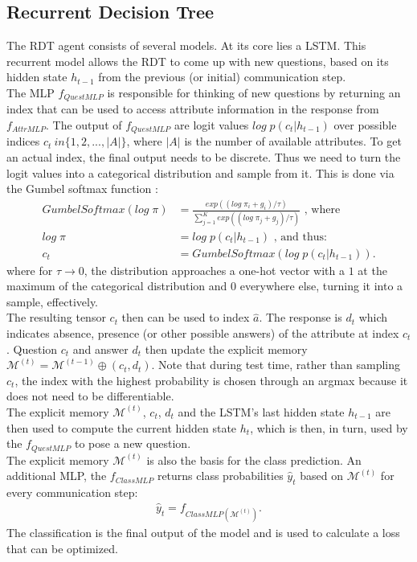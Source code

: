 \documentclass[a4paper,cleardoubleempty,BCOR1cm, 11pt]{report}
\begin{document}
\subsection{Recurrent Decision Tree}
The RDT agent consists of several models. At its core lies a LSTM. This recurrent model allows the RDT to come up with new questions, based on its hidden state $h_{t-1}$ from the previous (or initial) communication step.\\
The MLP $f_{QuestMLP}$ is responsible for thinking of new questions by returning an index that can be used to access attribute information in the response from $f_{AttrMLP}$. The output of $f_{QuestMLP}$ are logit values $log\;p(c_t|h_{t-1})$ over possible indices $c_t \ in \lbrace 1,2,...,|A| \rbrace$, where $|A|$ is the number of available attributes. To get an actual index, the final output needs to be discrete. Thus we need to turn the logit values into a categorical distribution and sample from it. This is done via the Gumbel softmax function \cite{jang2016categorical}:
\begin{align}
		GumbelSoftmax(log\;\pi) &= \frac{exp((log\;\pi_i + g_i)/\tau)}{\sum_{j=1}^{K}exp((log\;\pi_j + g_j)/\tau)}\text{ , where}\\
			log\;\pi &=log\;p(c_t|h_{t-1})\text{ , and thus:}\\
			c_t &= GumbelSoftmax(log\;p(c_t|h_{t-1})).
\end{align}
where for $\tau \rightarrow 0$, the distribution approaches a one-hot vector with a $1$ at the maximum of the categorical distribution and $0$ everywhere else, turning it into a sample, effectively.\\
The resulting tensor $c_t$ then can be used to index $\hat{a}$. The response is $d_t$ which indicates absence, presence (or other possible answers) of the attribute at index $c_t$. Question $c_t$ and answer $d_t$ then update the explicit memory $\mathcal{M}^{(t)} = \mathcal{M}^{(t-1)} \oplus (c_t, d_t)$. Note that during test time, rather than sampling $c_t$, the index with the highest probability is chosen through an argmax because it does not need to be differentiable.\\
The explicit memory $\mathcal{M}^{(t)}$, $c_t$, $d_t$ and the LSTM's last hidden state $h_{t-1}$ are then used to compute the current hidden state $h_t$, which is then, in turn, used by the $f_{QuestMLP}$ to pose a new question.\\
The explicit memory $\mathcal{M}^{(t)}$ is also the basis for the class prediction. An additional MLP, the $f_{ClassMLP}$ returns class probabilities $\hat{y}_t$ based on  $\mathcal{M}^{(t)}$ for every communication step:
\begin{align}
	\hat{y}_t = f_{ClassMLP( \mathcal{M}^{(t)})}.
\end{align} The classification is the final output of the model and is used to calculate a loss that can be optimized.
\end{document}

